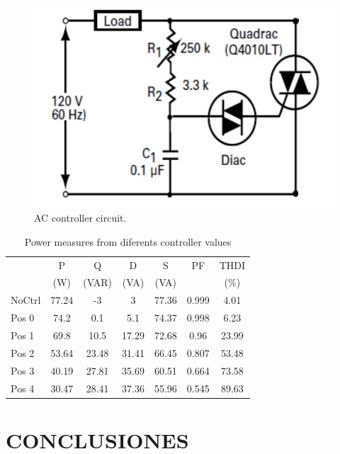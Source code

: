 \documentclass[journal]{IEEEtran}
\begin{document}
\begin{figure}[h]
\centering
\includegraphics[clip,width=\columnwidth]{controller.png}
\caption{AC controller circuit.}
\label{ACcontroller}
\end{figure}

\begin{table}
\caption{Power measures from diferents controller values}
\begin{tabular}{|p{1.2cm}|c|c|c|c|c|c|}
\hline 
 & P  & Q  & D  & S  & PF & THDI  \\
 &(W) & (VAR) &(VA) & (VA) &  & (\%) \\ \hline  
NoCtrl & 77.24 & -3 & 3 & 77.36 & 0.999 & 4.01 \\ 
\hline 
Pos 0 & 74.2 & 0.1 & 5.1 & 74.37 & 0.998 & 6.23 \\ 
\hline 
Pos 1 & 69.8 & 10.5 & 17.29 & 72.68 & 0.96 & 23.99 \\
\hline 
Pos 2 & 53.64 & 23.48 & 31.41 & 66.45 & 0.807 & 53.48 \\
\hline 
Pos 3 & 40.19 & 27.81 & 35.69 & 60.51 & 0.664 & 73.58 \\ 
\hline
Pos 4 & 30.47 & 28.41 & 37.36 & 55.96 & 0.545 & 89.63 \\ 
\hline 
\end{tabular}
\end{table}

\section{CONCLUSIONES}

\end{document}
